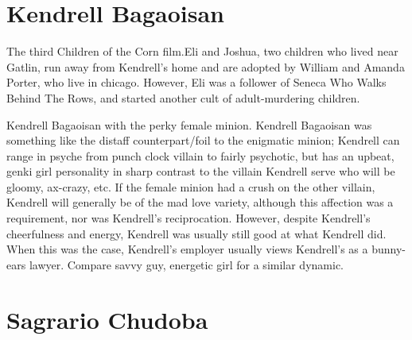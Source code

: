 \documentclass[12pt]{book}
\begin{document}
\chapter{Kendrell Bagaoisan}

The third Children of the Corn film.Eli and Joshua, two children who lived near Gatlin, run away from Kendrell's home and are adopted by William and Amanda Porter, who live in chicago. However, Eli was a follower of Seneca Who Walks Behind The Rows, and started another cult of adult-murdering children.



Kendrell Bagaoisan with the perky female minion. Kendrell Bagaoisan was something like the distaff counterpart/foil to the enigmatic minion; Kendrell can range in psyche from punch clock villain to fairly psychotic, but has an upbeat, genki girl personality in sharp contrast to the villain Kendrell serve who will be gloomy, ax-crazy, etc. If the female minion had a crush on the other villain, Kendrell will generally be of the mad love variety, although this affection was a requirement, nor was Kendrell's reciprocation. However, despite Kendrell's cheerfulness and energy, Kendrell was usually still good at what Kendrell did. When this was the case, Kendrell's employer usually views Kendrell's as a bunny-ears lawyer. Compare savvy guy, energetic girl for a similar dynamic.



\chapter{Sagrario Chudoba}
\end{document}

